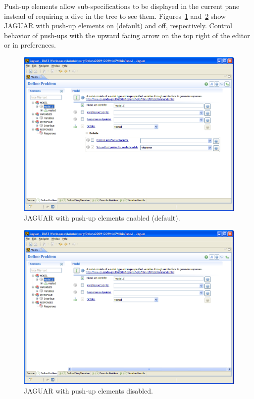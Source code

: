 Push-up elements allow sub-specifications to be displayed in the
current pane instead of requiring a dive in the tree to see them.
Figures~\ref{fig:input:jaguar_pushup_on}
and~\ref{fig:input:jaguar_pushup_off} show JAGUAR with push-up
elements on (default) and off, respectively.  Control behavior of
push-ups with the upward facing arrow on the top right of the editor
or in preferences.

\begin{figure}
  \centering
  \includegraphics[scale=0.4]{images/jaguar_pushup_on}
  \caption{JAGUAR with push-up elements enabled (default).}
  \label{fig:input:jaguar_pushup_on}
\end{figure}

\begin{figure}
  \centering
  \includegraphics[scale=0.4]{images/jaguar_pushup_off}
  \caption{JAGUAR with push-up elements disabled.}
  \label{fig:input:jaguar_pushup_off}
\end{figure}

